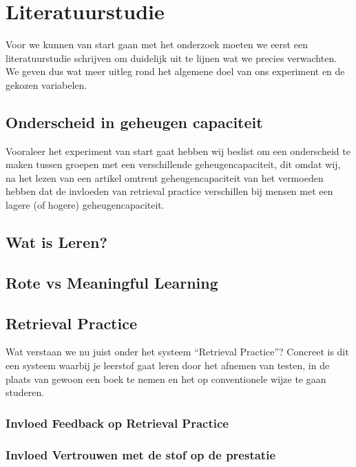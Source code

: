\documentclass[12pt,a4paper]{article}
\begin{document}
      
    \newpage
    \section{Literatuurstudie}
    
    Voor we kunnen van start gaan met het onderzoek moeten we eerst een literatuurstudie schrijven om duidelijk uit te lijnen wat we precies verwachten. We geven dus wat meer uitleg rond het algemene doel van ons experiment en de gekozen variabelen.
    
        \subsection{Onderscheid in geheugen capaciteit}
        
        Vooraleer het experiment van start gaat hebben wij beslist om een onderscheid te maken tussen groepen met een verschillende geheugencapaciteit, dit omdat wij, na het lezen van een artikel omtrent geheugencapaciteit van \cite{Agarwal2016} het vermoeden hebben dat de invloeden van retrieval practice verschillen bij mensen met een lagere (of hogere) geheugencapaciteit.
                
        \subsection{Wat is Leren?}
        
        \subsection{Rote vs Meaningful Learning}
        
        \subsection{Retrieval Practice}
        
        Wat verstaan we nu juist onder het systeem ``Retrieval Practice''? Concreet is dit een systeem waarbij je leerstof gaat leren door het afnemen van testen, in de plaats van gewoon een boek te nemen en het op conventionele wijze te gaan studeren.
        
            \subsubsection{Invloed Feedback op Retrieval Practice}
    
            \subsubsection{Invloed Vertrouwen met de stof op de prestatie}
            
\end{document}
